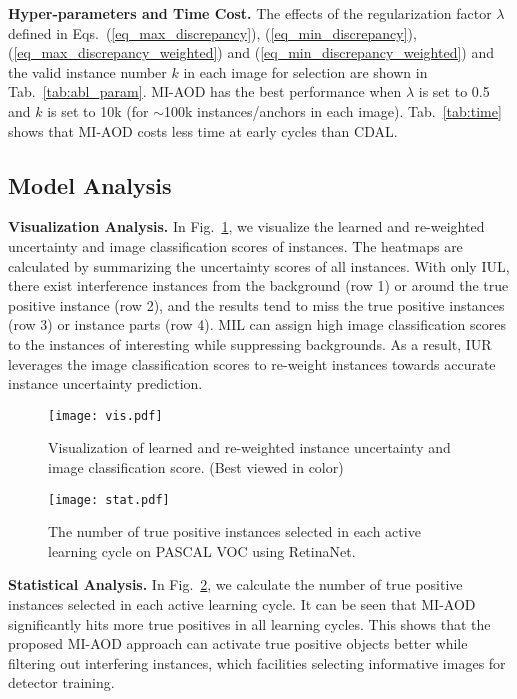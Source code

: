 \documentclass[final]{cvpr}
\begin{document}
\textbf{Hyper-parameters and Time Cost.} The effects of the regularization factor $\lambda$ defined in Eqs.~(\ref{eq_max_discrepancy}), (\ref{eq_min_discrepancy}), (\ref{eq_max_discrepancy_weighted}) and (\ref{eq_min_discrepancy_weighted}) and the valid instance number $k$ in each image for selection are shown in Tab.~\ref{tab:abl_param}. MI-AOD has the best performance when $\lambda$ is set to 0.5 and $k$ is set to 10k (for $\sim$100k instances/anchors in each image).
Tab.~\ref{tab:time} shows that MI-AOD costs less time at early cycles than CDAL.

\subsection{Model Analysis}
\textbf{Visualization Analysis.} In Fig.~\ref{fig:vis}, we visualize the learned and re-weighted uncertainty and image classification scores of instances. The heatmaps are calculated by summarizing the uncertainty scores of all instances. With only IUL, there exist interference instances from the background (row 1) or around the true positive instance (row 2), and the results tend to miss the true positive instances (row 3) or instance parts (row 4).
MIL can assign high image classification scores to the instances of interesting while suppressing backgrounds. As a result, IUR leverages the image classification scores to re-weight instances towards accurate instance uncertainty prediction.

\begin{figure}[t]
    \centering
    \texttt{[image: vis.pdf]}
    \caption{Visualization of learned and re-weighted instance uncertainty and image classification score. (Best viewed in color)
    }
    \label{fig:vis}
\end{figure}

\begin{figure}[t]
    \centering
    \texttt{[image: stat.pdf]}
    \caption{The number of true positive instances selected in each active learning cycle on PASCAL VOC using RetinaNet.}
    \label{fig:stat}
\end{figure}

\textbf{Statistical Analysis.} In Fig.~\ref{fig:stat}, we calculate the number of true positive instances selected in each active learning cycle. It can be seen that MI-AOD significantly hits more true positives in all learning cycles. This shows that the proposed MI-AOD approach can activate true positive objects better while filtering out interfering instances, which facilities selecting informative images for detector training.
\end{document}

